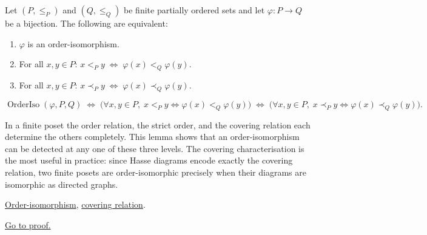 
\begin{lemma}
\label{lem:order-iso-finite-characterizations}
Let $(P, \leq_P)$ and $(Q, \leq_Q)$ be finite partially ordered sets and
let $\varphi : P \to Q$ be a bijection.  The following are equivalent:
\begin{enumerate}
  \item $\varphi$ is an order-isomorphism.
  \item For all $x, y \in P$:\; $x <_P y \;\Longleftrightarrow\; \varphi(x) <_Q \varphi(y)$.
  \item For all $x, y \in P$:\; $x \prec_P y \;\Longleftrightarrow\; \varphi(x) \prec_Q \varphi(y)$.
\end{enumerate}
\end{lemma}

\begin{remark*}
\[
\operatorname{OrderIso}(\varphi, P, Q)
\;\Longleftrightarrow\;
\bigl(\forall x,y \in P,\; x <_P y \Leftrightarrow \varphi(x) <_Q \varphi(y)\bigr)
\;\Longleftrightarrow\;
\bigl(\forall x,y \in P,\; x \prec_P y \Leftrightarrow \varphi(x) \prec_Q \varphi(y)\bigr).
\]
\end{remark*}

\begin{remark*}[Interpretation]
In a finite poset the order relation, the strict order, and the covering
relation each determine the others completely.  This lemma shows that an
order-isomorphism can be detected at any one of these three levels.  The
covering characterisation is the most useful in practice: since Hasse
diagrams encode exactly the covering relation, two finite posets are
order-isomorphic precisely when their diagrams are isomorphic as directed
graphs.
\end{remark*}

\begin{remark*}[Dependencies]
\hyperref[def:order-isomorphism]{Order-isomorphism},
\hyperref[def:covering-relation]{covering relation}.
\end{remark*}

\begin{remark*}[Proof]
\hyperref[prf:order-iso-finite-characterizations]{Go to proof.}
\end{remark*}

